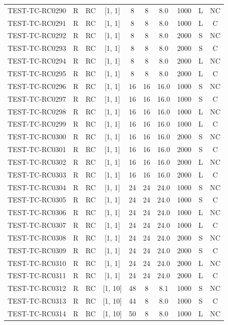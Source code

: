 \begin{longtable}{lccccccccc}
TEST-TC-RC0290 & R & RC & [1, 1] & 8 & 8 & 8.0 & 1000 & L & NC \\
TEST-TC-RC0291 & R & RC & [1, 1] & 8 & 8 & 8.0 & 1000 & L & C \\
TEST-TC-RC0292 & R & RC & [1, 1] & 8 & 8 & 8.0 & 2000 & S & NC \\
TEST-TC-RC0293 & R & RC & [1, 1] & 8 & 8 & 8.0 & 2000 & S & C \\
TEST-TC-RC0294 & R & RC & [1, 1] & 8 & 8 & 8.0 & 2000 & L & NC \\
TEST-TC-RC0295 & R & RC & [1, 1] & 8 & 8 & 8.0 & 2000 & L & C \\
TEST-TC-RC0296 & R & RC & [1, 1] & 16 & 16 & 16.0 & 1000 & S & NC \\
TEST-TC-RC0297 & R & RC & [1, 1] & 16 & 16 & 16.0 & 1000 & S & C \\
TEST-TC-RC0298 & R & RC & [1, 1] & 16 & 16 & 16.0 & 1000 & L & NC \\
TEST-TC-RC0299 & R & RC & [1, 1] & 16 & 16 & 16.0 & 1000 & L & C \\
TEST-TC-RC0300 & R & RC & [1, 1] & 16 & 16 & 16.0 & 2000 & S & NC \\
TEST-TC-RC0301 & R & RC & [1, 1] & 16 & 16 & 16.0 & 2000 & S & C \\
TEST-TC-RC0302 & R & RC & [1, 1] & 16 & 16 & 16.0 & 2000 & L & NC \\
TEST-TC-RC0303 & R & RC & [1, 1] & 16 & 16 & 16.0 & 2000 & L & C \\
TEST-TC-RC0304 & R & RC & [1, 1] & 24 & 24 & 24.0 & 1000 & S & NC \\
TEST-TC-RC0305 & R & RC & [1, 1] & 24 & 24 & 24.0 & 1000 & S & C \\
TEST-TC-RC0306 & R & RC & [1, 1] & 24 & 24 & 24.0 & 1000 & L & NC \\
TEST-TC-RC0307 & R & RC & [1, 1] & 24 & 24 & 24.0 & 1000 & L & C \\
TEST-TC-RC0308 & R & RC & [1, 1] & 24 & 24 & 24.0 & 2000 & S & NC \\
TEST-TC-RC0309 & R & RC & [1, 1] & 24 & 24 & 24.0 & 2000 & S & C \\
TEST-TC-RC0310 & R & RC & [1, 1] & 24 & 24 & 24.0 & 2000 & L & NC \\
TEST-TC-RC0311 & R & RC & [1, 1] & 24 & 24 & 24.0 & 2000 & L & C \\
TEST-TC-RC0312 & R & RC & [1, 10] & 48 & 8 & 8.1 & 1000 & S & NC \\
TEST-TC-RC0313 & R & RC & [1, 10] & 44 & 8 & 8.0 & 1000 & S & C \\
TEST-TC-RC0314 & R & RC & [1, 10] & 50 & 8 & 8.0 & 1000 & L & NC \\

\end{longtable}
